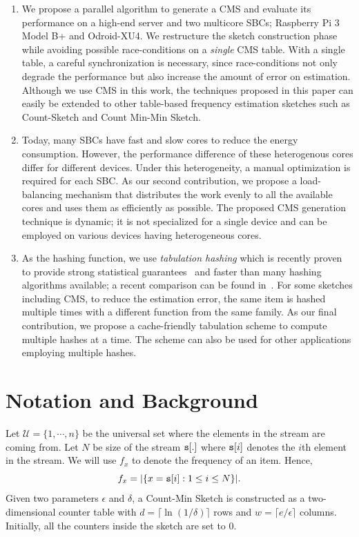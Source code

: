 \documentclass[runningheads]{llncs}
\begin{document}
\vspace{-0.2\topsep}
\begin{enumerate}[leftmargin=*]
\item We propose a parallel algorithm to generate a CMS and evaluate its performance on a high-end server and two multicore SBCs; Raspberry Pi 3 Model B+ and Odroid-XU4.  We restructure the sketch construction phase while avoiding possible race-conditions on a {\em single} CMS table. With a single table, a careful synchronization is necessary, since race-conditions not only degrade the performance but also increase the amount of error on estimation. Although we use CMS in this work, the techniques proposed in this paper can easily be extended to other table-based frequency estimation sketches such as Count-Sketch and Count Min-Min Sketch. 

\item Today, many SBCs have fast and slow cores to reduce the energy consumption.  However, the performance difference of these heterogenous cores differ for different devices. Under this heterogeneity, a manual optimization is required for each SBC. As our second contribution, we propose a load-balancing mechanism that distributes the work evenly to all the available cores and uses them as efficiently as possible. The proposed CMS generation technique is dynamic; it is not specialized for a single device and can be employed on various devices having heterogeneous cores. 

\item 
As the hashing function, we use {\em tabulation hashing} which is recently proven to provide strong statistical guarantees~\cite{thorup2017} and faster than many hashing algorithms available; a recent comparison can be found in~\cite{Dahlgaard2017}. For some sketches including CMS, to reduce the estimation error, the same item is hashed multiple times with a different function from the same family. As our final contribution, we propose a cache-friendly tabulation scheme to compute multiple hashes at a time. The scheme can also be used for other applications employing multiple hashes.
\end{enumerate}
\vspace{-0.2\topsep}

 \section{Notation and Background}\label{sec:not}

Let $\mathcal{U} = \{1,\cdots,n\}$ be the universal set where the elements in the stream are coming from. 
Let $N$ be size of the stream ${\tt s}[.]$ where ${\tt s}[i]$ denotes the $i$th element in the stream.
We will use $f_x$ to denote the frequency of an item. Hence, $$f_x = |\{x = {\tt s}[i]: 1 \leq i \leq N\}|.$$
Given two parameters $\epsilon$ and $\delta$, a Count-Min Sketch is constructed as a two-dimensional counter table with 
$d = \lceil \ln(1/\delta) \rceil$ rows and $w = \lceil e/\epsilon \rceil$ columns. Initially, all the counters inside the sketch are set to $0$. 
\end{document}

